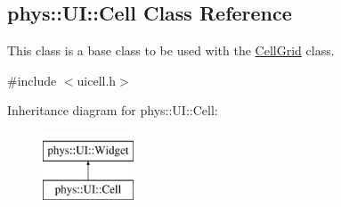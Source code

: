 \hypertarget{classphys_1_1UI_1_1Cell}{
\subsection{phys::UI::Cell Class Reference}
\label{df/d1e/classphys_1_1UI_1_1Cell}
}


This class is a base class to be used with the \hyperlink{classphys_1_1UI_1_1CellGrid}{CellGrid} class.  




{\ttfamily \#include $<$uicell.h$>$}

Inheritance diagram for phys::UI::Cell:\begin{figure}[H]
\begin{center}
\leavevmode
\includegraphics[height=2.000000cm]{df/d1e/classphys_1_1UI_1_1Cell}
\end{center}
\end{figure}
